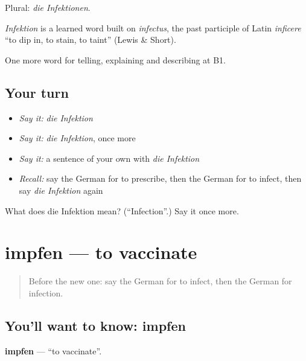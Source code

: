 Plural: \emph{die Infektionen}.

\begin{cousinweb}
\emph{Infektion} is a learned word built on \emph{infectus}, the past participle of Latin \emph{inficere} \textquotedblleft{}to dip in, to stain, to taint\textquotedblright{} (Lewis \& Short).
\end{cousinweb}

\begin{grammarlens}[title={What you've built}]
One more word for telling, explaining and describing at B1.
\end{grammarlens}

\subsection*{Your turn}
\begin{itemize}
\raggedright
  \item \emph{Say it:} \emph{die Infektion}
  \item \emph{Say it:} \emph{die Infektion}, once more
  \item \emph{Say it:} a sentence of your own with \emph{die Infektion}
  \item \emph{Recall:} say the German for to prescribe, then the German for to infect, then say \emph{die Infektion} again
\end{itemize}

\begin{tcolorbox}[breakable,colback=teal!4,colframe=teal!35!black,title={Before you move on}]
What does die Infektion mean? (\textquotedblleft{}Infection\textquotedblright{}.) Say it once more.
\end{tcolorbox}
\section[impfen]{impfen — to vaccinate}

\label{lesson:GE-C488-impfen}



\begin{quote}
Before the new one: say the German for to infect, then the German for infection.
\end{quote}

\subsection*{You'll want to know: impfen}
\textbf{impfen} — \textquotedblleft{}to vaccinate\textquotedblright{}.

